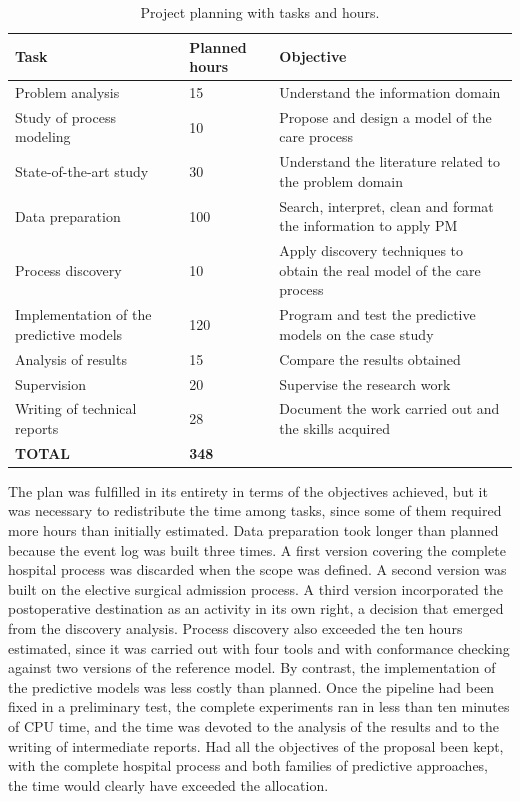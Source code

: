 \begin{table}[htbp]
\centering
\caption{Project planning with tasks and hours.}
\label{tab:planificacion}
\begin{tabular}{L{5.2cm}C{1.8cm}L{6.6cm}}
\toprule
Task & Planned hours & Objective \\
\midrule
Problem analysis & 15 & Understand the information domain \\
Study of process modeling & 10 & Propose and design a model of the care process \\
State-of-the-art study & 30 & Understand the literature related to the problem domain \\
Data preparation & 100 & Search, interpret, clean and format the information to apply PM \\
Process discovery & 10 & Apply discovery techniques to obtain the real model of the care process \\
Implementation of the predictive models & 120 & Program and test the predictive models on the case study \\
Analysis of results & 15 & Compare the results obtained \\
Supervision & 20 & Supervise the research work \\
Writing of technical reports & 28 & Document the work carried out and the skills acquired \\
\midrule
\textbf{TOTAL} & \textbf{348} & \\
\bottomrule
\end{tabular}
\end{table}

The plan was fulfilled in its entirety in terms of the objectives achieved, but it was necessary to redistribute the time among tasks, since some of them required more hours than initially estimated. Data preparation took longer than planned because the event log was built three times. A first version covering the complete hospital process was discarded when the scope was defined. A second version was built on the elective surgical admission process. A third version incorporated the postoperative destination as an activity in its own right, a decision that emerged from the discovery analysis. Process discovery also exceeded the ten hours estimated, since it was carried out with four tools and with conformance checking against two versions of the reference model. By contrast, the implementation of the predictive models was less costly than planned. Once the pipeline had been fixed in a preliminary test, the complete experiments ran in less than ten minutes of CPU time, and the time was devoted to the analysis of the results and to the writing of intermediate reports. Had all the objectives of the proposal been kept, with the complete hospital process and both families of predictive approaches, the time would clearly have exceeded the allocation.

